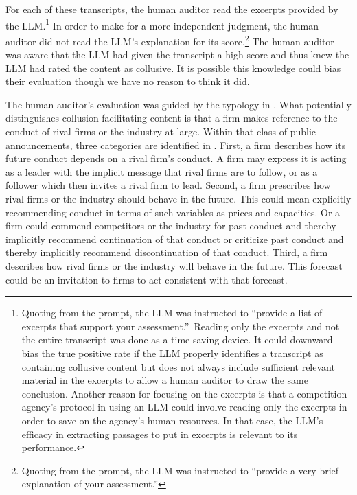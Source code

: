 For each of these transcripts, the human auditor read the excerpts provided
by the LLM.\footnote{%
Quoting from the prompt, the LLM was instructed to \textquotedblleft provide
a list of excerpts that support your assessment.\textquotedblright\ Reading
only the excerpts and not the entire transcript was done as a time-saving
device. It could downward bias the true positive rate if the LLM properly
identifies a transcript as containing collusive content but does not always
include sufficient relevant material in the excerpts to allow a human
auditor to draw the same conclusion. Another reason for focusing on the
excerpts is that a competition agency's protocol in using an LLM could
involve reading only the excerpts in order to save on the agency's human
resources. In that case, the LLM's efficacy in extracting passages to put in
excerpts is relevant to its performance.} In order to make for a more
independent judgment, the human auditor did not read the LLM's explanation
for its score.\footnote{%
Quoting from the prompt, the LLM was instructed to \textquotedblleft provide
a very brief explanation of your assessment.\textquotedblright} The human
auditor was aware that the LLM had given the transcript a high score and
thus knew the LLM had rated the content as collusive. It is possible this
knowledge could bias their evaluation though we have no reason to think it
did.

The human auditor's evaluation was guided by the typology in
\textcite{harrington2022collusion}. What potentially distinguishes
collusion-facilitating content is that a firm makes reference to the conduct
of rival firms or the industry at large. Within that class of public
announcements, three categories are identified in
\textcite{harrington2022collusion}. First, a firm describes how its future
conduct depends on a rival firm's conduct. A firm may express it is acting
as a leader with the implicit message that rival firms are to follow, or as
a follower which then invites a rival firm to lead. Second, a firm
prescribes how rival firms or the industry should behave in the
future. This could mean explicitly recommending conduct in terms of such
variables as prices and capacities. Or a firm could commend competitors or
the industry for past conduct and thereby implicitly recommend
continuation of that conduct or criticize past conduct and thereby
implicitly recommend discontinuation of that conduct. Third, a firm
describes how rival firms or the industry will behave in the
future. This forecast could be an invitation to firms to act consistent with
that forecast.

